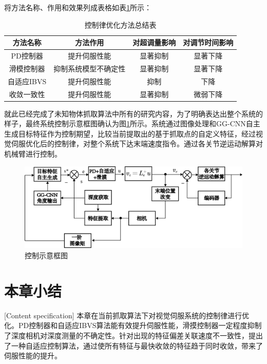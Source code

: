 \documentclass[fontset=fandol,type=bachelor,campus=harbin,bsmainpagenumberline=true]{hithesisbook}
\begin{document}
\newpage
将方法名称、作用和效果列成表格如表\ref{控制律优化方法总结表}所示：
\begin{table}[htbp]
\caption{控制律优化方法总结表}
\label{控制律优化方法总结表}
\vspace{0.5em}\centering\wuhao
\begin{tabular}{cccc}
\toprule[2pt]
方法名称 & 方法作用 & 对超调量影响 & 对调节时间影响\\
\midrule[1pt]
 PD控制器 & 提升伺服性能 & 显著抑制 & 显著下降\\
 滑模控制器 & 抑制系统模型不确定性 & 显著抑制 & 显著下降\\
 自适应IBVS & 提升伺服性能 & 抑制 & 下降\\
 收敛一致性 & 提升伺服性能 & 显著抑制 & 微弱下降\\

\bottomrule[1.5pt]
\end{tabular}
\end{table}


就此已经完成了未知物体抓取算法中所有的研究内容，为了明确表达出整个系统的样子，最终系统控制示意框图确认为图\ref{控制示意框图}所示。系统通过图像处理和GG-CNN自主生成目标特征作为控制期望，比较当前提取出的基于抓取点的自定义特征，经过视觉伺服优化后的控制律，对整个系统下达末端速度指令。通过各关节逆运动解算对机械臂进行控制。
\begin{figure}[h]
	\centering
	\includegraphics[width=1.0\textwidth]{chapter5/控制示意框图}
	\caption{控制示意框图}
	\label{控制示意框图}
\end{figure}



\section{本章小结}[Content specification]
本章在当前抓取算法下对视觉伺服系统的控制律进行优化。PD控制器和自适应IBVS算法能有效提升伺服性能，滑摸控制器一定程度抑制了深度相机对深度测量的不确定性。针对出现的特征偏差关联速度不一致性，提出了一种自适应控制算法，通过使所有特征与最快收敛的特征趋于同时收敛，带来了伺服性能的提升。
\end{document}
